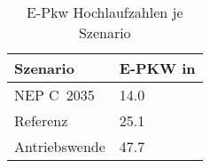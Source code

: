 {
\renewcommand{\arraystretch}{1.2}%
\begin{table}[H]
	\begin{center}
		\caption{E-Pkw Hochlaufzahlen je Szenario}
		\begin{tabu} to 0.6\textwidth {X[1] X[2, r]}
			\hline
			Szenario         & E-PKW in \si{\MioStk}	\\ \hline
			NEP C~\num{2035} & \num{14.0}               \\
			Referenz         & \num{25.1}               \\
			Antriebswende    & \num{47.7}               \\ \hline
		\end{tabu}
		\label{tab:SzenarienRampUp}
	\end{center}
	\vspace{-3mm}%
\end{table}
}